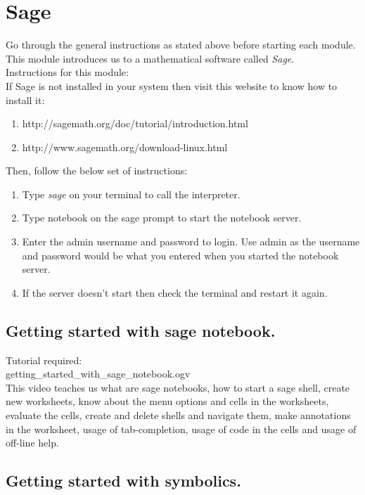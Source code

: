 \documentclass[11pt,twocolumn]{article}
\begin{document}
\section{Sage}
Go through the general instructions as stated above before starting each module.\\
This module introduces us to a mathematical software called \emph{Sage}.\\

Instructions for this module:\\
If Sage is not installed in your system then visit this website to know how to install it:
\begin{enumerate}
\item http://sagemath.org/doc/tutorial/introduction.html
\item http://www.sagemath.org/download-linux.html
\end{enumerate}
Then, follow the below set of instructions:
\begin{enumerate}
 \item Type \emph{sage} on your terminal to call the interpreter. 
 \item Type notebook on the sage prompt to start the notebook server.
 \item Enter the admin username and password to login. Use admin as the username and password would be what you entered when you started the notebook server. 
 \item If the server doesn't start then check the terminal and restart it again. 
\end{enumerate}

\subsection{Getting started with sage notebook.}

Tutorial required: \\getting\_started\_with\_sage\_notebook.ogv \\

This video teaches us what are sage notebooks, how to start a sage shell, create new worksheets, know about the menu options and cells in the worksheets, evaluate the cells, create and delete shells and navigate them, make annotations in the worksheet, usage of tab-completion, usage of code in the cells and usage of off-line help. 

\subsection{Getting started with symbolics.}
\end{document}
